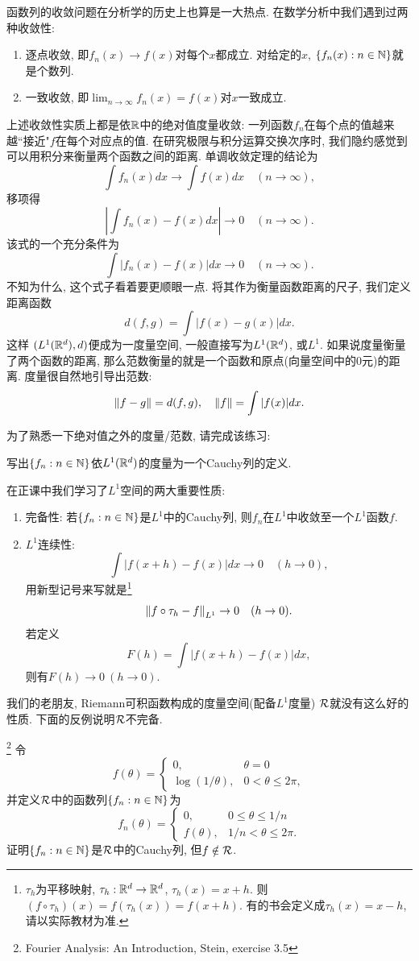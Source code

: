函数列的收敛问题在分析学的历史上也算是一大热点. 
在数学分析中我们遇到过两种收敛性:
\begin{enumerate}
    \item 逐点收敛, 即$f_n(x) \to f(x)$对每个$x$都成立. 对给定的$x$, $\{f_n(x):n \in \mathbb{N}\}$就是个数列. 
    \item 一致收敛, 即$\lim_{n \to \infty}f_n(x)=f(x)$对$x$一致成立. 
\end{enumerate}
上述收敛性实质上都是依$\mathbb{R}$中的绝对值度量收敛: 一列函数$f_n$在每个点的值越来越``接近"$f$在每个对应点的值.
在研究极限与积分运算交换次序时, 我们隐约感觉到可以用积分来衡量两个函数之间的距离. 单调收敛定理的结论为
$$\int f_n(x)dx \to \int f(x)dx \quad (n \to \infty),$$
移项得
$$\left|\int f_n(x)-f(x) dx \right| \to 0 \quad (n \to \infty).$$
该式的一个充分条件为
$$\int |f_n(x)-f(x)| dx \to 0 \quad (n \to \infty).$$
不知为什么, 这个式子看着要更顺眼一点. 将其作为衡量函数距离的尺子, 我们定义距离函数
$$d(f,g) = \int |f(x)-g(x)|dx. $$
这样
$(L^1(\mathbb{R}^d), d)$便成为一度量空间, 一般直接写为$L^1(\mathbb{R}^d)$, 或$L^1$. 
如果说度量衡量了两个函数的距离, 那么范数衡量的就是一个函数和原点(向量空间中的$0$元)的距离. 度量很自然地引导出范数:
$$\norm{f-g} = d(f, g), \quad \norm{f} = \int |f(x)|dx. $$

为了熟悉一下绝对值之外的度量/范数, 请完成该练习:
\begin{exercise}
    写出$\{f_n:n \in \mathbb{N}\}$依$L^1(\mathbb{R}^d)$的度量为一个Cauchy列的定义. 
\end{exercise}

在正课中我们学习了$L^1$空间的两大重要性质:
\begin{enumerate}
    \item 完备性: 若$\{f_n:n \in \mathbb{N}\}$是$L^1$中的Cauchy列, 则$f_n$在$L^1$中收敛至一个$L^1$函数$f$. 
    \item $L^1$连续性:
    $$\int |f(x+h)-f(x)|dx \to 0 \quad (h \to 0), $$
    用新型记号来写就是\footnote{$\tau_h$为平移映射, $\tau_h: \mathbb{R}^d \to \mathbb{R}^d$, $\tau_h(x) = x+h$. 则$(f \circ \tau_h)(x) = f(\tau_h(x)) = f(x+h)$. 有的书会定义成$\tau_h(x)=x-h$, 请以实际教材为准.}
    $$\norm{f \circ \tau_h - f}_{L^1} \to 0 \quad (h \to 0).$$
    若定义$$F(h)=\int |f(x+h)-f(x)|dx,$$
    则有$F(h) \to 0~(h \to 0)$. 
\end{enumerate}


我们的老朋友, Riemann可积函数构成的度量空间(配备$L^1$度量)
$\mathcal{R}$就没有这么好的性质. 
下面的反例说明$\mathcal{R}$不完备.

\begin{example}\footnote{Fourier Analysis: An Introduction, Stein, exercise 3.5}
    令
    $$f(\theta) = \begin{cases}
        0, & \theta = 0 \\
        \log(1/\theta), & 0 < \theta \leq 2\pi,
    \end{cases}$$
    并定义$\mathcal{R}$中的函数列$\{f_n: n \in \mathbb{N}\}$为
    $$f_n(\theta) = \begin{cases}
        0,         & 0 \leq \theta \leq 1/n \\
        f(\theta), & 1/n < \theta \leq 2\pi.
    \end{cases}$$
    证明$\{f_n: n \in \mathbb{N}\}$是$\mathcal{R}$中的Cauchy列, 但$f \notin \mathcal{R}$. 
\end{example}

